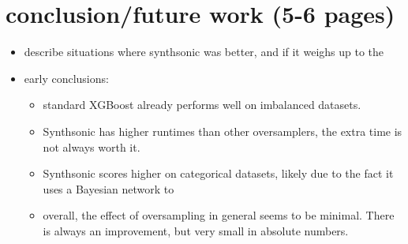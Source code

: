 \documentclass{article}
\begin{document}
\section{conclusion/future work (5-6 pages)}
    \begin{itemize}
        \item describe situations where synthsonic was better, and if it weighs up to the 
        \item early conclusions:
        \begin{itemize}
            \item standard XGBoost already performs well on imbalanced datasets.
            \item Synthsonic has higher runtimes than other oversamplers, the extra time is not always worth it.
            \item Synthsonic scores higher on categorical datasets, likely due to the fact it uses a Bayesian network to 
            \item overall, the effect of oversampling in general seems to be minimal. There is always an improvement, but very small in absolute numbers.
        \end{itemize}
    \end{itemize}
\end{document}

